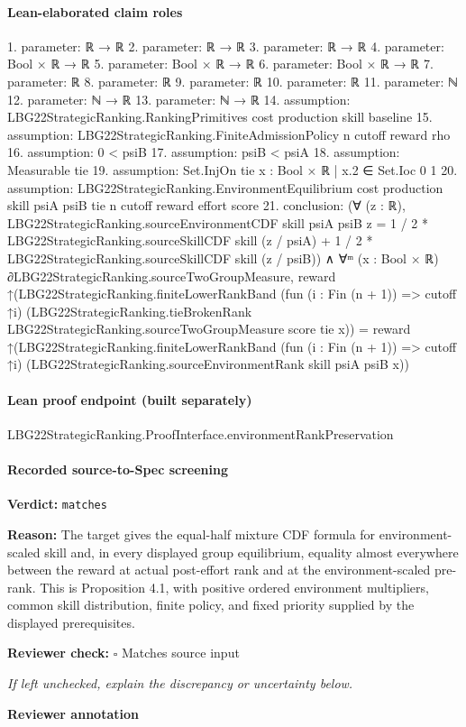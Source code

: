 \documentclass[10pt]{article}
\newcommand{\reviewerbox}{%
  \par\noindent\fbox{\parbox{0.96\linewidth}{\rule{0pt}{0.38in}}}\par
}
\newcommand{\reviewmatch}[1]{%
  \par\noindent\textbf{Reviewer check:} $\square$\; #1\par
  \noindent\emph{If left unchecked, explain the discrepancy or uncertainty below.}\par
}
\begin{document}
\paragraph{Lean-elaborated claim roles}\begin{ReviewVerbatim}
1. parameter: ℝ → ℝ
2. parameter: ℝ → ℝ
3. parameter: ℝ → ℝ
4. parameter: Bool × ℝ → ℝ
5. parameter: Bool × ℝ → ℝ
6. parameter: Bool × ℝ → ℝ
7. parameter: ℝ
8. parameter: ℝ
9. parameter: ℝ
10. parameter: ℝ
11. parameter: ℕ
12. parameter: ℕ → ℝ
13. parameter: ℕ → ℝ
14. assumption: LBG22StrategicRanking.RankingPrimitives cost production skill baseline
15. assumption: LBG22StrategicRanking.FiniteAdmissionPolicy n cutoff reward rho
16. assumption: 0 < psiB
17. assumption: psiB < psiA
18. assumption: Measurable tie
19. assumption: Set.InjOn tie {x : Bool × ℝ | x.2 ∈ Set.Ioc 0 1}
20. assumption: LBG22StrategicRanking.EnvironmentEquilibrium cost production skill psiA psiB tie n cutoff reward effort score
21. conclusion: (∀ (z : ℝ),
    LBG22StrategicRanking.sourceEnvironmentCDF skill psiA psiB z =
      1 / 2 * LBG22StrategicRanking.sourceSkillCDF skill (z / psiA) +
        1 / 2 * LBG22StrategicRanking.sourceSkillCDF skill (z / psiB)) ∧
  ∀ᵐ (x : Bool × ℝ) ∂LBG22StrategicRanking.sourceTwoGroupMeasure,
    reward
        ↑(LBG22StrategicRanking.finiteLowerRankBand (fun (i : Fin (n + 1)) => cutoff ↑i)
            (LBG22StrategicRanking.tieBrokenRank LBG22StrategicRanking.sourceTwoGroupMeasure score tie x)) =
      reward
        ↑(LBG22StrategicRanking.finiteLowerRankBand (fun (i : Fin (n + 1)) => cutoff ↑i)
            (LBG22StrategicRanking.sourceEnvironmentRank skill psiA psiB x))
\end{ReviewVerbatim}

\paragraph{Lean proof endpoint (built separately)}\begin{ReviewVerbatim}
LBG22StrategicRanking.ProofInterface.environmentRankPreservation
\end{ReviewVerbatim}

\paragraph{Recorded source-to-Spec screening}
\textbf{Verdict:} \texttt{matches}
\\
{\raggedright
\textbf{Reason:} The target gives the equal-\allowbreak{}half mixture CDF formula for environment-\allowbreak{}scaled skill and, in every displayed group equilibrium, equality almost everywhere between the reward at actual post-\allowbreak{}effort rank and at the environment-\allowbreak{}scaled pre-\allowbreak{}rank.\allowbreak{} This is Proposition 4.\allowbreak{}1, with positive ordered environment multipliers, common skill distribution, finite policy, and fixed priority supplied by the displayed prerequisites.\allowbreak{}
\par}
\reviewmatch{Matches source input}
\noindent\textbf{Reviewer annotation}\par
\reviewerbox
\clearpage
\hypertarget{source-claim-77aa097e6083e865}{}
\end{document}
